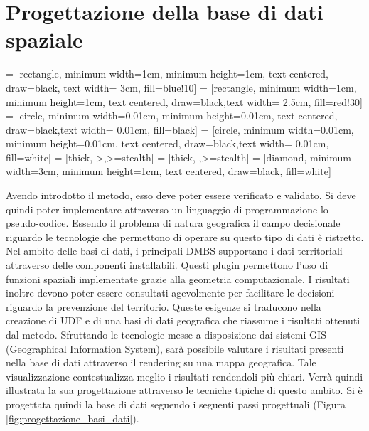 
\chapter{Progettazione della base di dati spaziale}
\label{ProgettazioneBasiDati}
 = [rectangle, minimum width=1cm, minimum height=1cm, text centered, draw=black, text width= 3cm, fill=blue!10]
 = [rectangle, minimum width=1cm, minimum height=1cm, text centered, draw=black,text width= 2.5cm, fill=red!30]
 = [circle, minimum width=0.01cm, minimum height=0.01cm, text centered, draw=black,text width= 0.01cm, fill=black]
 = [circle, minimum width=0.01cm, minimum height=0.01cm, text centered, draw=black,text width= 0.01cm, fill=white]
 = [thick,->,>=stealth]
 = [thick,-,>=stealth]
 = [diamond, minimum width=3cm, minimum height=1cm, text centered, draw=black, fill=white]

 
Avendo introdotto il metodo, esso deve poter essere verificato e validato. 
Si deve quindi poter implementare attraverso un linguaggio di programmazione lo pseudo-codice. Essendo il problema di natura geografica il campo decisionale riguardo le tecnologie che permettono di operare su questo tipo di dati è ristretto.
Nel ambito delle basi di dati, i principali DMBS supportano i dati territoriali attraverso delle componenti installabili. Questi plugin permettono l'uso di funzioni
spaziali implementate grazie alla geometria computazionale. I risultati inoltre devono poter essere consultati agevolmente per facilitare le decisioni riguardo la prevenzione del territorio. Queste esigenze si traducono nella creazione di UDF e di una basi di dati geografica che riassume i risultati ottenuti dal metodo. Sfruttando le tecnologie messe a disposizione dai sistemi GIS (Geographical Information System), sarà possibile valutare i risultati presenti nella base di dati attraverso il rendering su una mappa geografica. Tale visualizzazione contestualizza meglio i risultati rendendoli più chiari. Verrà quindi illustrata la sua progettazione attraverso le tecniche tipiche di questo ambito.
Si è progettata quindi la base di dati seguendo i seguenti passi progettuali (Figura \ref{fig:progettazione_basi_dati}).

